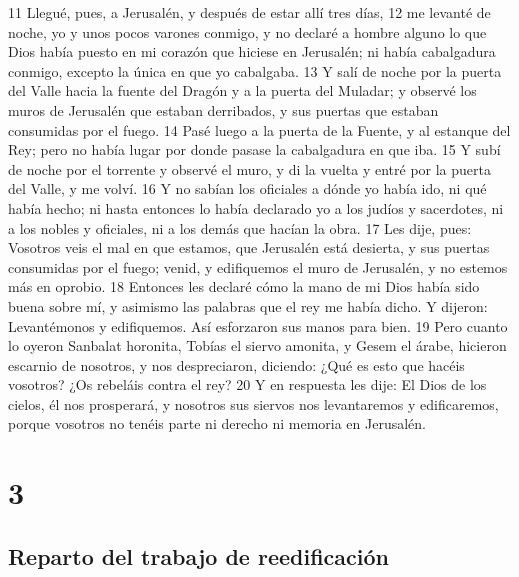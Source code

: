 11 Llegué, pues, a Jerusalén, y después de estar allí tres días,
12 me levanté de noche, yo y unos pocos varones conmigo, y no declaré a hombre alguno lo que Dios había puesto en mi corazón que hiciese en Jerusalén; ni había cabalgadura conmigo, excepto la única en que yo cabalgaba.
13 Y salí de noche por la puerta del Valle hacia la fuente del Dragón y a la puerta del Muladar; y observé los muros de Jerusalén que estaban derribados, y sus puertas que estaban consumidas por el fuego.
14 Pasé luego a la puerta de la Fuente, y al estanque del Rey; pero no había lugar por donde pasase la cabalgadura en que iba.
15 Y subí de noche por el torrente y observé el muro, y di la vuelta y entré por la puerta del Valle, y me volví.
16 Y no sabían los oficiales a dónde yo había ido, ni qué había hecho; ni hasta entonces lo había declarado yo a los judíos y sacerdotes, ni a los nobles y oficiales, ni a los demás que hacían la obra.
17 Les dije, pues: Vosotros veis el mal en que estamos, que Jerusalén está desierta, y sus puertas consumidas por el fuego; venid, y edifiquemos el muro de Jerusalén, y no estemos más en oprobio.
18 Entonces les declaré cómo la mano de mi Dios había sido buena sobre mí, y asimismo las palabras que el rey me había dicho. Y dijeron: Levantémonos y edifiquemos. Así esforzaron sus manos para bien. 
19 Pero cuanto lo oyeron Sanbalat horonita, Tobías el siervo amonita, y Gesem el árabe, hicieron escarnio de nosotros, y nos despreciaron, diciendo: ¿Qué es esto que hacéis vosotros? ¿Os rebeláis contra el rey?
20 Y en respuesta les dije: El Dios de los cielos, él nos prosperará, y nosotros sus siervos nos levantaremos y edificaremos, porque vosotros no tenéis parte ni derecho ni memoria en Jerusalén.

\chapter{3}

\section*{Reparto del trabajo de reedificación}


